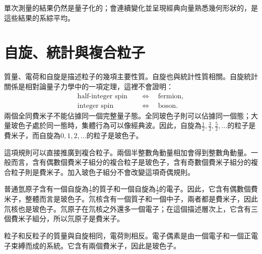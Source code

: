 單次測量的結果仍然是量子化的；會連續變化並呈現經典向量熟悉幾何形狀的，是這些結果的系綜平均。

\section{自旋、統計與複合粒子}

質量、電荷和自旋是描述粒子的幾項主要性質。自旋也與統計性質相關。自旋統計關係是相對論量子力學中的一項定理，這裡不會證明：
\begin{equation}
\begin{aligned}
\text{half-integer spin} &\quad\Longleftrightarrow\quad \text{fermion},\\
\text{integer spin} &\quad\Longleftrightarrow\quad \text{boson}.
\end{aligned}
\end{equation}
兩個全同費米子不能佔據同一個完整量子態。全同玻色子則可以佔據同一個態；大量玻色子處於同一態時，集體行為可以像經典波。因此，自旋為\(\tfrac12,\tfrac32,\tfrac52,\ldots\)的粒子是費米子，而自旋為\(0,1,2,\ldots\)的粒子是玻色子。

這項規則可以直接推廣到複合粒子。兩個半整數角動量相加會得到整數角動量。一般而言，含有偶數個費米子組分的複合粒子是玻色子，含有奇數個費米子組分的複合粒子則是費米子。加入玻色子組分不會改變這項奇偶規則。

普通氫原子含有一個自旋為\(\tfrac12\)的質子和一個自旋為\(\tfrac12\)的電子。因此，它含有偶數個費米子，整體而言是玻色子。氘核含有一個質子和一個中子，兩者都是費米子，因此氘核也是玻色子。氘原子在氘核之外還多一個電子；在這個描述層次上，它含有三個費米子組分，所以氘原子是費米子。

粒子和反粒子的質量與自旋相同，電荷則相反。電子偶素是由一個電子和一個正電子束縛而成的系統。它含有兩個費米子，因此是玻色子。

\begin{classroomqa}
\end{classroomqa}

